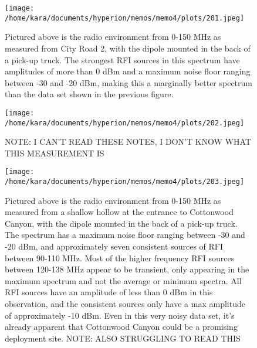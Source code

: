 \documentclass[11pt]{article}
\begin{document}
\begin{figure}[H]
    \begin{center}
    \texttt{[image: /home/kara/documents/hyperion/memos/memo4/plots/201.jpeg]}
    \end{center}
    \caption{
        Pictured above is the radio environment from 0-150 MHz as measured from 
        City Road 2, with the dipole mounted in the back of a pick-up truck.  
        The strongest RFI sources in this spectrum have amplitudes of more than 
        0 dBm and a maximum noise floor ranging between -30 and -20 dBm, making 
          this a marginally better spectrum than the data set shown in the 
          previous figure.
    }
    \label{fig:201}
\end{figure}
\begin{figure}[H]
    \begin{center}
    \texttt{[image: /home/kara/documents/hyperion/memos/memo4/plots/202.jpeg]}
    \end{center}
    \caption{
        NOTE: I CAN'T READ THESE NOTES, I DON'T KNOW WHAT THIS MEASUREMENT IS
    }
    \label{fig:202}
\end{figure}
\begin{figure}[H]
    \begin{center}
    \texttt{[image: /home/kara/documents/hyperion/memos/memo4/plots/203.jpeg]}
    \end{center}
    \caption{
        Pictured above is the radio environment from 0-150 MHz as measured from 
        a shallow hollow at the entrance to Cottonwood Canyon, with the dipole 
        mounted in the back of a pick-up truck.  The spectrum has a maximum 
        noise floor ranging between -30 and -20 dBm, and approximately seven 
        consistent sources of RFI between 90-110 MHz. Most of the higher 
        frequency RFI sources between 120-138 MHz appear to be transient, only 
        appearing in the maximum spectrum and not the average or minimum 
        spectra. All RFI sources have an amplitude of less than 0 dBm in this 
        observation, and the consistent sources only have a max amplitude of 
        approximately -10 dBm. Even in this very noisy data set, it's already 
        apparent that Cottonwood Canyon could be a promising deployment site.
        NOTE: ALSO STRUGGLING TO READ THIS
    }
    \label{fig:203}
\end{figure}
\end{document}
